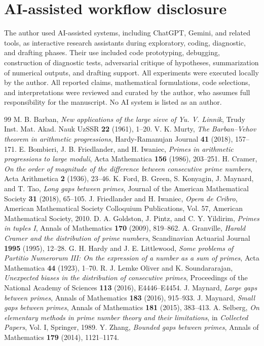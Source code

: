 \documentclass[10pt]{article}
\begin{document}
\section{AI-assisted workflow disclosure}
The author used AI-assisted systems, including ChatGPT, Gemini, and related tools, as interactive research assistants during exploratory, coding, diagnostic, and drafting phases. Their use included code prototyping, debugging, construction of diagnostic tests, adversarial critique of hypotheses, summarization of numerical outputs, and drafting support. All experiments were executed locally by the author. All reported claims, mathematical formulations, code selections, and interpretations were reviewed and curated by the author, who assumes full responsibility for the manuscript. No AI system is listed as an author.
\begin{thebibliography}{99}
 M. B. Barban, \emph{New applications of the large sieve of Yu. V. Linnik}, Trudy Inst. Mat. Akad. Nauk UzSSR \textbf{22} (1961), 1--20.
 V. K. Murty, \emph{The Barban--Vehov theorem in arithmetic progressions}, Hardy-Ramanujan Journal \textbf{41} (2018), 157--171.
 E. Bombieri, J. B. Friedlander, and H. Iwaniec, \emph{Primes in arithmetic progressions to large moduli}, Acta Mathematica \textbf{156} (1986), 203--251.
 H. Cramer, \emph{On the order of magnitude of the difference between consecutive prime numbers}, Acta Arithmetica \textbf{2} (1936), 23--46.
 K. Ford, B. Green, S. Konyagin, J. Maynard, and T. Tao, \emph{Long gaps between primes}, Journal of the American Mathematical Society \textbf{31} (2018), 65--105.
 J. Friedlander and H. Iwaniec, \emph{Opera de Cribro}, American Mathematical Society Colloquium Publications, Vol. 57, American Mathematical Society, 2010.
 D. A. Goldston, J. Pintz, and C. Y. Yildirim, \emph{Primes in tuples I}, Annals of Mathematics \textbf{170} (2009), 819--862.
 A. Granville, \emph{Harald Cramer and the distribution of prime numbers}, Scandinavian Actuarial Journal \textbf{1995} (1995), 12--28.
 G. H. Hardy and J. E. Littlewood, \emph{Some problems of Partitio Numerorum III: On the expression of a number as a sum of primes}, Acta Mathematica \textbf{44} (1923), 1--70.
 R. J. Lemke Oliver and K. Soundararajan, \emph{Unexpected biases in the distribution of consecutive primes}, Proceedings of the National Academy of Sciences \textbf{113} (2016), E4446--E4454.
 J. Maynard, \emph{Large gaps between primes}, Annals of Mathematics \textbf{183} (2016), 915--933.
 J. Maynard, \emph{Small gaps between primes}, Annals of Mathematics \textbf{181} (2015), 383--413.
 A. Selberg, \emph{On elementary methods in prime number theory and their limitations}, in \emph{Collected Papers}, Vol. I, Springer, 1989.
 Y. Zhang, \emph{Bounded gaps between primes}, Annals of Mathematics \textbf{179} (2014), 1121--1174.
\end{thebibliography}
\end{document}
